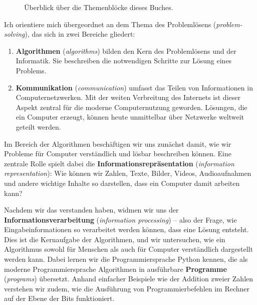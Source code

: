 \documentclass[
  letterpaper,
  DIV=11]{scrartcl}
\begin{document}
\begin{figure}


\caption{\label{fig-advance-organizer-dap}Überblick über die
Themenblöcke dieses Buches.}

\end{figure}%

Ich orientiere mich übergeordnet an dem Thema des Problemlösens
(\emph{problem-solving}), das sich in zwei Bereiche gliedert:

\begin{enumerate}
\def\labelenumi{\arabic{enumi}.}
\item
  \textbf{Algorithmen} (\emph{algorithms}) bilden den Kern des
  Problemlösens und der Informatik. Sie beschreiben die notwendigen
  Schritte zur Lösung eines Problems.
\item
  \textbf{Kommunikation} (\emph{communication}) umfasst das Teilen von
  Informationen in Computernetzwerken. Mit der weiten Verbreitung des
  Internets ist dieser Aspekt zentral für die moderne Computernutzung
  geworden. Lösungen, die ein Computer erzeugt, können heute unmittelbar
  über Netzwerke weltweit geteilt werden.
\end{enumerate}

Im Bereich der Algorithmen beschäftigen wir uns zunächst damit, wie wir
Probleme für Computer verständlich und lösbar beschreiben können. Eine
zentrale Rolle spielt dabei die \textbf{Informationsrepräsentation
}(\emph{information representation}): Wie können wir Zahlen, Texte,
Bilder, Videos, Audioaufnahmen und andere wichtige Inhalte so
darstellen, dass ein Computer damit arbeiten kann?

Nachdem wir das verstanden haben, widmen wir uns der
\textbf{Informationsverarbeitung }(\emph{information processing}) --
also der Frage, wie Eingabeinformationen so verarbeitet werden können,
dass eine Lösung entsteht. Dies ist die Kernaufgabe der Algorithmen, und
wir untersuchen, wie ein Algorithmus sowohl für Menschen als auch für
Computer verständlich dargestellt werden kann. Dabei lernen wir die
Programmiersprache Python kennen, die als moderne Programmiersprache
Algorithmen in ausführbare \textbf{Programme} (\emph{programs})
übersetzt. Anhand einfacher Beispiele wie der Addition zweier Zahlen
verstehen wir zudem, wie die Ausführung von Programmierbefehlen im
Rechner auf der Ebene der Bits funktioniert.
\end{document}
